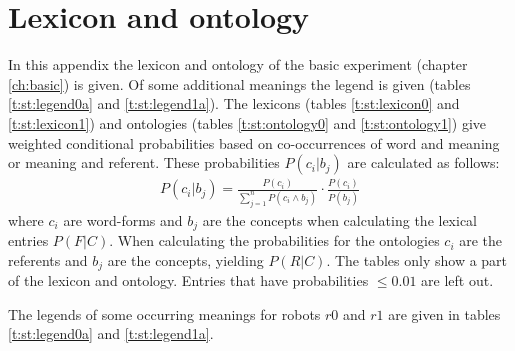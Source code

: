 \chapter{Lexicon and ontology}\label{a:lexicon}

In this appendix the lexicon and ontology of the basic experiment (chapter \ref{ch:basic}) is given. Of some additional meanings the legend is given (tables \ref{t:st:legend0a} and \ref{t:st:legend1a}). The lexicons (tables \ref{t:st:lexicon0} and \ref{t:st:lexicon1}) and ontologies (tables \ref{t:st:ontology0} and \ref{t:st:ontology1}) give  weighted conditional probabilities based on co-occurrences of word and meaning or meaning and referent. These probabilities $P(c_i|b_j)$ are calculated as follows:
\begin{eqnarray}
P(c_i|b_j) = \frac{P(c_i)}{\sum_{j=1}^n P(c_i \wedge b_j)} \cdot \frac{P(c_i)}{P(b_j)}
\end{eqnarray}
where $c_i$ are word-forms and $b_j$ are the concepts when calculating the lexical entries $P(F|C)$. When calculating the probabilities for the ontologies $c_i$ are the referents and $b_j$ are the concepts, yielding $P(R|C)$. The tables only show a part of the lexicon and ontology. Entries that have probabilities $\leq 0.01$ are left out.

The legends of some occurring meanings for robots $r0$ and $r1$ are given in tables \ref{t:st:legend0a} and \ref{t:st:legend1a}.

